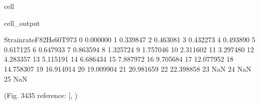 \documentclass[letterpaper,10pt,english]{jupyterBook}
\begin{document}
\begin{sphinxuseclass}{cell}
\begin{sphinxVerbatimOutput}
\begin{sphinxuseclass}{cell_output}
\begin{sphinxVerbatim}[commandchars=\\\{\}]
					Strainrate\PYGZus{}F82Hs60T973  
					0                 0.000000  
					1                 0.339847  
					2                 0.463081  
					3                 0.432273  
					4                 0.493890  
					5                 0.617125  
					6                 0.647933  
					7                 0.863594  
					8                 1.325724  
					9                 1.757046  
					10                2.311602  
					11                3.297480  
					12                4.283357  
					13                5.115191  
					14                6.686434  
					15                7.887972  
					16                9.705684  
					17               12.077952  
					18               14.758307  
					19               16.914914  
					20               19.009904  
					21               20.981659  
					22               22.398858  
					23                     NaN  
					24                     NaN  
					25                     NaN  
				\end{sphinxVerbatim}
				
				\noindent{}
				
				\noindent{}
				
		\end{sphinxuseclass}\end{sphinxVerbatimOutput}
		
	\end{sphinxuseclass}
	\sphinxAtStartPar
	(Fig. 34\sphinxhyphen{}35 reference: {[}, \sphinxhref{https://drive.google.com/file/d/1FfEH-sGlPOCbHuMMiTm9s0CApPQEpgYb/view?usp=drive\_link}{Shinozuka2015}{]})
	
	
\end{document}
